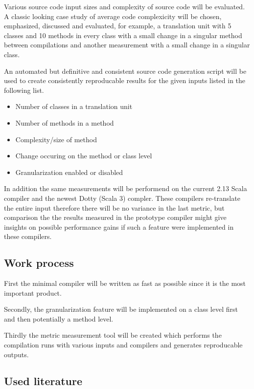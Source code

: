 \documentclass{VUMIFPSbakalaurinis}
\begin{document}
\begin{samepage}
Various source code input sizes and complexity of source code will be evaluated.
A classic looking case study of average code complexicity will be chosen, emphasized, discussed and evaluated, for example, a translation unit with 5 classes and 10 methods in every class with a small change in a singular method between compilations and another measurement with a small change in a singular class.

An automated but definitive and consistent source code generation script will be used to create consistently reproducable results for the given inputs listed in the following list.

\begin{itemize}
	\item Number of classes in a translation unit
	\item Number of methods in a method
	\item Complexity/size of method
	\item Change occuring on the method or class level
	\item Granularization enabled or disabled
\end{itemize}

In addition the same measurements will be performend on the current 2.13 Scala compiler and the newest Dotty (Scala 3) compler.
These compilers re-translate the entire input therefore there will be no variance in the last metric, but comparison the the results measured in the prototype compiler might give insights on possible performance gains if such a feature were implemented in these compilers.

\subsection{Work process}
First the minimal compiler will be written as fast as possible since it is the most important product.

Secondly, the granularization feature will be implemented on a class level first and then potentially a method level.

Thirdly the metric measurement tool will be created which performs the compilation runs with various inputs and compilers and generates reproducable outputs.

\subsection{Used literature}
\end{samepage}
\end{document}
